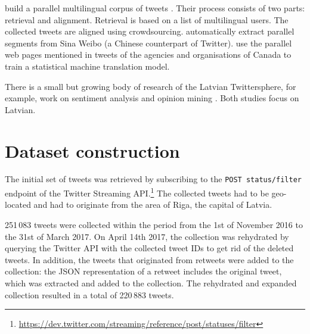 \documentclass[11pt,a4paper]{article}
\begin{document}
\citet{SANVICENTE16.465} build a parallel multilingual corpus of tweets%
. Their process consists of two parts: retrieval and alignment. Retrieval is based on a list of multilingual users. The collected tweets are aligned using crowdsourcing. \citet{ling-EtAl:2013:ACL2013} automatically extract parallel segments from Sina Weibo (a Chinese counterpart of Twitter).
%
\citet{gotti-langlais-farzindar:2013:LASM} use the parallel web pages mentioned in tweets of the agencies and organisations of Canada to train a statistical machine translation model.

There is a small but growing body of research of the Latvian Twittersphere, for example, work on sentiment analysis \cite{Peisenieks2014} and opinion mining \cite{vspats2016opinion}. Both studies focus on Latvian.

\section{Dataset construction}
\label{sec:construction}

The initial set of tweets was retrieved by subscribing to the \texttt{POST status/filter} endpoint of the Twitter Streaming API.\footnote{\url{https://dev.twitter.com/streaming/reference/post/statuses/filter}}
The collected tweets had to be geo-located and had to originate from the area of Riga, the capital of Latvia.\footnotemark{}



251\,083 tweets were collected within the period from the 1st of November 2016 to the 31st of March 2017. On April 14th 2017, the collection was rehydrated by querying the Twitter API with the collected tweet IDs to get rid of the deleted tweets. In addition, the tweets that originated from retweets were added to the collection: the JSON representation of a retweet includes the original tweet, which was extracted and added to the collection. The rehydrated and expanded collection resulted in a total of 220\,883 tweets. %
\end{document}

